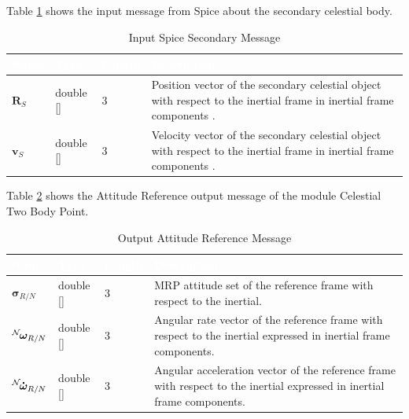 \documentclass[]{AVSSimReportMemo}
\begin{document}
Table \ref{tab:inputSecTable} shows the input message from Spice about the secondary celestial body.
\begin{table}[h!]
	\centering
	\caption{Input Spice Secondary Message}
	\begin{tabular}{|l|l|l|p{3in}|}
		\hline
		\rowcolor{BrickRed}
		\textcolor{white}{Name} & \textcolor{white}{Type} &
		\textcolor{white}{Length} &
		\textcolor{white}{Description}  \\ \hline
		$\bm{R}_S$  & double [] & 3 &
		Position vector of the secondary celestial object with respect to the inertial frame in inertial frame components . \\ \hline
		$\bm{v}_S$  & double [] & 3 &
		Velocity vector of the secondary celestial object with respect to the inertial frame in inertial frame components . \\ \hline
	\end{tabular}
	\label{tab:inputSecTable}
\end{table}


Table \ref{tab:outputTable} shows the Attitude Reference output message of the module Celestial Two Body Point.
\begin{table}[h!]
	\centering
	\caption{Output Attitude Reference Message}
	\begin{tabular}{|l|l|l|p{3in}|}
		\hline
		\rowcolor{BrickRed}
		\textcolor{white}{Name} & \textcolor{white}{Type} &
		\textcolor{white}{Length} &
		\textcolor{white}{Description}  \\ \hline
		$\bm{\sigma}_{R/N}$ & double [] & 3 &
		MRP attitude set of the reference frame with respect to the inertial. \\ \hline
		$\leftexp{N} {\bm{\omega}_{R/N}}$ & double [] & 3 &
		Angular rate vector of the reference frame with respect to the inertial expressed in inertial frame components. \\ \hline
		$\leftexp{N} {\bm{\dot{\omega}}_{R/N}}$ & double [] & 3 &
		Angular acceleration vector of the reference frame with respect to the inertial expressed in inertial frame components. \\ \hline
	\end{tabular}
	\label{tab:outputTable}
\end{table}
\newpage
\end{document}
